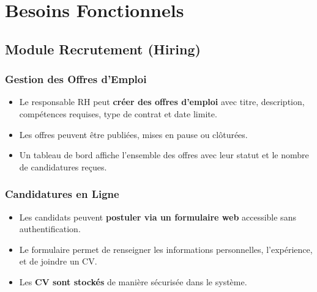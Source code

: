 \documentclass[11pt,a4paper]{report}
\begin{document}
\chapter{Besoins Fonctionnels}

\section{Module Recrutement (Hiring)}

\subsection{Gestion des Offres d'Emploi}
\begin{tcolorbox}[enhanced, colback=lightgray, colframe=primarycolor, arc=2mm, boxrule=0.5pt, breakable]
    \begin{itemize}
        \item Le responsable RH peut \textbf{créer des offres d'emploi} avec titre, description, compétences requises, type de contrat et date limite.
        \item Les offres peuvent être publiées, mises en pause ou clôturées.
        \item Un tableau de bord affiche l'ensemble des offres avec leur statut et le nombre de candidatures reçues.
    \end{itemize}
\end{tcolorbox}

\subsection{Candidatures en Ligne}
\begin{tcolorbox}[enhanced, colback=lightgray, colframe=primarycolor, arc=2mm, boxrule=0.5pt, breakable]
    \begin{itemize}
        \item Les candidats peuvent \textbf{postuler via un formulaire web} accessible sans authentification.
        \item Le formulaire permet de renseigner les informations personnelles, l'expérience, et de joindre un CV.
        \item Les \textbf{CV sont stockés} de manière sécurisée dans le système.
    \end{itemize}
\end{tcolorbox}
\end{document}
